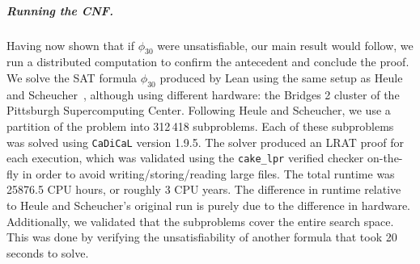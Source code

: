 \subparagraph*{Running the CNF.}
Having now shown that if $\phi_{30}$ were unsatisfiable,
our main result would follow,
we run a distributed computation to confirm the antecedent
and conclude the proof.
We solve the SAT formula $\phi_{30}$ produced by Lean using the same setup as 
Heule and Scheucher~\cite{emptyHexagonNumber}, although using different hardware:
the Bridges 2 cluster of the Pittsburgh Supercomputing Center. 
Following Heule and Scheucher,
we use a partition of the problem into 312\,418 subproblems.
Each of these subproblems was
solved using {\tt CaDiCaL} version 1.9.5.
The solver produced an LRAT proof for each execution,
which was validated using the {\tt cake\_lpr} verified checker on-the-fly
in order to avoid writing/storing/reading large files. 
The total runtime was 25876.5 CPU hours, or roughly 3 CPU years.
The difference in runtime relative to Heule and Scheucher's original run
is purely due to the difference in hardware.
Additionally,
we validated that the subproblems cover the entire search space. 
This was done by verifying the unsatisfiability
of another formula that took 20 seconds to solve. 


